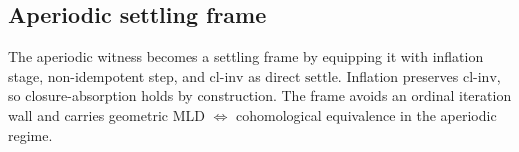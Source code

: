 \subsection{Aperiodic settling frame}

\begin{theorem}\label{thm:aperiodic-settle-frame}\leanok{}
The aperiodic witness becomes a settling frame by equipping it with inflation
stage, non-idempotent step, and \(\mathrm{cl\text{-}inv}\) as direct
\(\mathrm{settle}\).  Inflation preserves \(\mathrm{cl\text{-}inv}\), so
closure-absorption holds by construction.  The frame avoids an ordinal iteration
wall and carries geometric MLD \(\iff\) cohomological equivalence in the
aperiodic regime.
\end{theorem}
